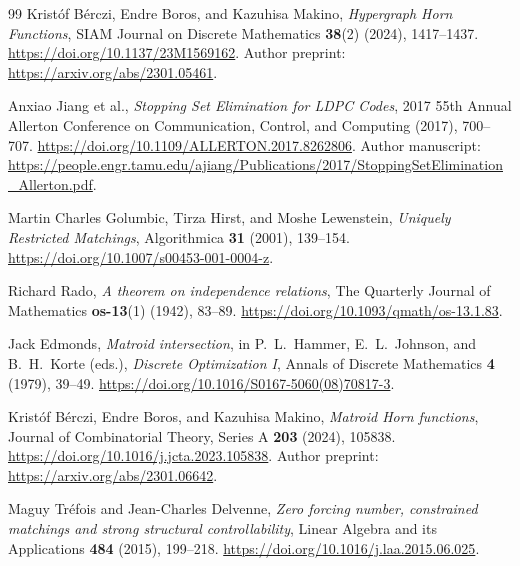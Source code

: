 \begin{thebibliography}{99}
Krist\'of B\'erczi, Endre Boros, and Kazuhisa Makino,
\emph{Hypergraph Horn Functions},
SIAM Journal on Discrete Mathematics \textbf{38}(2) (2024), 1417--1437.
\url{https://doi.org/10.1137/23M1569162}.
Author preprint: \url{https://arxiv.org/abs/2301.05461}.

Anxiao Jiang et al.,
\emph{Stopping Set Elimination for LDPC Codes},
2017 55th Annual Allerton Conference on Communication, Control,
and Computing (2017), 700--707.
\url{https://doi.org/10.1109/ALLERTON.2017.8262806}.
Author manuscript:
\url{https://people.engr.tamu.edu/ajiang/Publications/2017/StoppingSetElimination_Allerton.pdf}.

Martin Charles Golumbic, Tirza Hirst, and Moshe Lewenstein,
\emph{Uniquely Restricted Matchings},
Algorithmica \textbf{31} (2001), 139--154.
\url{https://doi.org/10.1007/s00453-001-0004-z}.

Richard Rado,
\emph{A theorem on independence relations},
The Quarterly Journal of Mathematics \textbf{os-13}(1) (1942), 83--89.
\url{https://doi.org/10.1093/qmath/os-13.1.83}.

Jack Edmonds,
\emph{Matroid intersection},
in P.~L.~Hammer, E.~L.~Johnson, and B.~H.~Korte (eds.),
\emph{Discrete Optimization I},
Annals of Discrete Mathematics \textbf{4} (1979), 39--49.
\url{https://doi.org/10.1016/S0167-5060(08)70817-3}.

Krist\'of B\'erczi, Endre Boros, and Kazuhisa Makino,
\emph{Matroid Horn functions},
Journal of Combinatorial Theory, Series A \textbf{203} (2024), 105838.
\url{https://doi.org/10.1016/j.jcta.2023.105838}.
Author preprint: \url{https://arxiv.org/abs/2301.06642}.

Maguy Tr\'efois and Jean-Charles Delvenne,
\emph{Zero forcing number, constrained matchings and strong structural
controllability},
Linear Algebra and its Applications \textbf{484} (2015), 199--218.
\url{https://doi.org/10.1016/j.laa.2015.06.025}.

\end{thebibliography}
\endgroup
